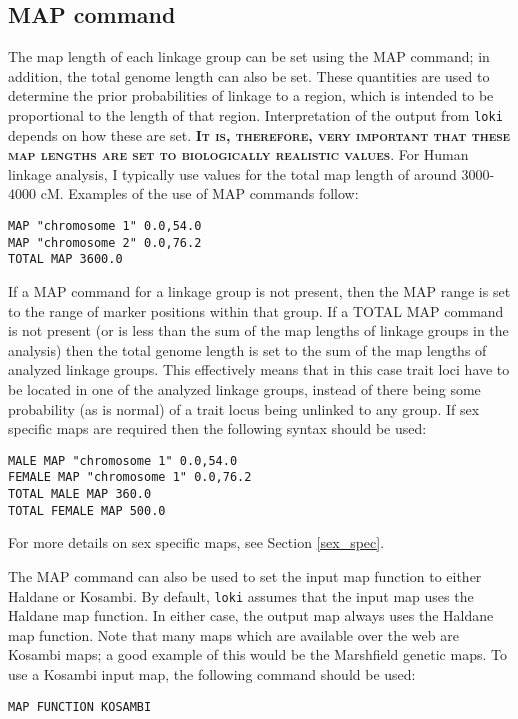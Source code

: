 \documentclass[10pt,a4paper]{article}
\newcommand{\Loki}{\texttt{loki}\xspace}
\begin{document}
\subsection{MAP command}\label{map1}
The map length of each linkage group can be set
using the MAP command; in addition, the total genome length can also be set.
These quantities are used to determine the prior probabilities of linkage to
a region, which is intended to be proportional to the length of that region.
Interpretation of the output from \Loki depends on how these are set.
\textbf{\textsc{It is, therefore, very important that these map lengths are
set to biologically realistic values}}.  For Human linkage analysis, I
typically use values for the total map length of around 3000-4000 cM.
Examples of the use of MAP commands follow:
\begin{verbatim}
MAP "chromosome 1" 0.0,54.0
MAP "chromosome 2" 0.0,76.2
TOTAL MAP 3600.0
\end{verbatim}
If a MAP command for a linkage group is not present, then the MAP range is
set to the range of marker positions within that group.  If a TOTAL MAP
command is not present (or is less than the sum of the map lengths of
linkage groups in the analysis) then the total genome length is set to the
sum of the map lengths of analyzed linkage groups.  This effectively means
that in this case trait loci have to be located in one of the analyzed
linkage groups, instead of there being some probability (as is normal) of a
trait locus being unlinked to any group.  If sex specific maps are required
then the following syntax should be used:
\begin{verbatim}
MALE MAP "chromosome 1" 0.0,54.0
FEMALE MAP "chromosome 1" 0.0,76.2
TOTAL MALE MAP 360.0
TOTAL FEMALE MAP 500.0
\end{verbatim}
For more details on sex specific maps, see Section \ref{sex_spec}.

\label{mapfunctions} The MAP command can also be used to set the input map
function to either Haldane or Kosambi.  By default, \Loki assumes that the
input map uses the Haldane map function.  In either case, the output map
always uses the Haldane map function.  Note that many maps which are
available over the web are Kosambi maps; a good example of this would be the
Marshfield genetic maps.  To use a Kosambi input map, the following command
should be used:
\begin{verbatim}
MAP FUNCTION KOSAMBI
\end{verbatim}
\end{document}
